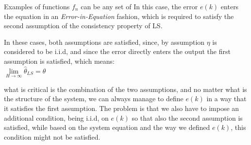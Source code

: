 \begin{example}
Examples of functions \(f_n\) can be any set of 
In this case, the error \(e(k)\) enters the equation in an \textit{Error-in-Equation} fashion, which is required to satisfy the second assumption of the consistency property of LS.

\begin{center}
\end{center}
In these cases, both assumptions are satisfied, since, by assumption \(\eta\) is considered to be i.i.d, and since the error directly enters the output the first assumption is satisfied, which means:\\
\(\lim\limits_{H \to \infty} \hat{\theta}_{LS} = \theta\)\\
\end{example}

what is critical is the combination of the two assumptions, and no matter what is the structure of the system, we can always manage to define \(e(k)\) in a way that it satisfies the first assumption. The problem is that we also have to impose an additional condition, being i.i.d, on \(e(k)\) so that also the second assumption is satisfied, while based on the system equation and the way we defined \(e(k)\), this condition might not be satisfied.\\

